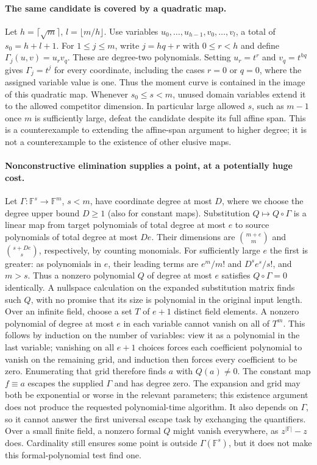 \documentclass[11pt]{article}
\begin{document}
\paragraph{The same candidate is covered by a quadratic map.}
Let $h=\lceil\sqrt m\rceil$, $l=\lfloor m/h\rfloor$. Use variables
$u_0,\ldots,u_{h-1},v_0,\ldots,v_l$, a total of $s_0=h+l+1$.
For $1\le j\le m$, write $j=hq+r$ with $0\le r<h$ and define
$\Gamma_j(u,v)=u_rv_q$. These are degree-two polynomials. Setting
$u_r=t^r$ and $v_q=t^{hq}$ gives $\Gamma_j=t^j$ for every coordinate,
including the cases $r=0$ or $q=0$, where the assigned variable value is one.
Thus the moment curve is contained in the image of this quadratic map.
Whenever $s_0\le s<m$, unused domain variables extend it to the allowed
competitor dimension. In particular large allowed $s$, such as $m-1$ once
$m$ is sufficiently large, defeat the candidate despite its full affine span.
This is a counterexample to extending the affine-span argument to higher
degree; it is not a counterexample to the existence of other elusive maps.

\paragraph{Nonconstructive elimination supplies a point, at a potentially huge cost.}
Let $\Gamma:\mathbb F^s\to\mathbb F^m$, $s<m$, have coordinate degree
at most $D$, where we choose the degree upper bound $D\ge1$ (also for constant maps). Substitution $Q\mapsto Q\circ\Gamma$ is a linear map from
target polynomials of total degree at most $e$ to source polynomials of total
degree at most $De$. Their dimensions are
$\binom{m+e}{m}$ and $\binom{s+De}{s}$, respectively, by counting monomials.
For sufficiently large $e$ the first is greater: as polynomials in $e$, their
leading terms are $e^m/m!$ and $D^s e^s/s!$, and $m>s$.
Thus a nonzero polynomial $Q$ of degree at most $e$ satisfies
$Q\circ\Gamma=0$ identically. A nullspace calculation on the expanded
substitution matrix finds such $Q$, with no promise that its size is polynomial
in the original input length.
Over an infinite field, choose a set $T$ of $e+1$ distinct field elements.
A nonzero polynomial of degree at most $e$ in each variable cannot vanish
on all of $T^m$. This follows by induction on the number of variables:
view it as a polynomial in the last variable; vanishing on all $e+1$ choices
forces each coefficient polynomial to vanish on the remaining grid, and
induction then forces every coefficient to be zero.
Enumerating that grid therefore finds $a$ with $Q(a)\ne0$. The constant
map $f\equiv a$ escapes the supplied $\Gamma$ and has degree zero.
The expansion and grid may both be exponential or worse in the relevant
parameters; this existence argument does not produce the requested polynomial-time
algorithm. It also depends on $\Gamma$, so it cannot answer the first universal
escape task by exchanging the quantifiers.
Over a small finite field, a nonzero formal $Q$ might vanish everywhere,
as $z^{|\mathbb F|}-z$ does. Cardinality still ensures some point is outside
$\Gamma(\mathbb F^s)$, but it does not make this formal-polynomial test find one.
\end{document}
